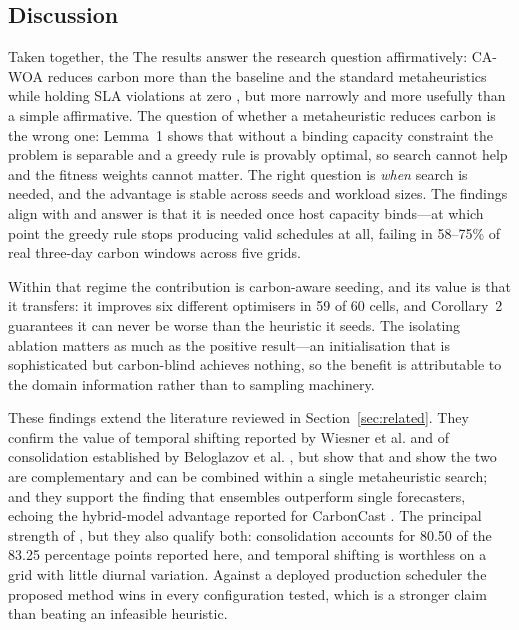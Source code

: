 \documentclass[12pt,a4paper]{article}
\providecommand{\DIFaddtex}[1]{{\protect\color{blue} \sf #1}} %
\providecommand{\DIFdeltex}[1]{{\protect\color{red} \scriptsize #1}} %
\providecommand{\DIFaddbegin}{} %
\providecommand{\DIFaddend}{} %
\providecommand{\DIFdelbegin}{} %
\providecommand{\DIFdelend}{} %
\providecommand{\DIFadd}[1]{\texorpdfstring{\DIFaddtex{#1}}{#1}} %
\providecommand{\DIFdel}[1]{\texorpdfstring{\DIFdeltex{#1}}{}} %
\providecommand{\DIFscaledelfig}{0.5}
\newlength{\DIFdelgraphicswidth} %
\newlength{\DIFdelgraphicsheight} %
\providecommand{\DIFaddincludegraphics}[2][]{{\color{blue}\fbox{\DIFOincludegraphics[#1]{#2}}}} %
\providecommand{\DIFdelincludegraphics}[2][]{%
\sbox{\DIFdelgraphicsbox}{\DIFOincludegraphics[#1]{#2}}%
\settoboxwidth{\DIFdelgraphicswidth}{\DIFdelgraphicsbox} %
\settoboxtotalheight{\DIFdelgraphicsheight}{\DIFdelgraphicsbox} %
\scalebox{\DIFscaledelfig}{%
\parbox[b]{\DIFdelgraphicswidth}{\usebox{\DIFdelgraphicsbox}\\[-\baselineskip] \rule{\DIFdelgraphicswidth}{0em}}\llap{\resizebox{\DIFdelgraphicswidth}{\DIFdelgraphicsheight}{%
\setlength{\unitlength}{\DIFdelgraphicswidth}%
\begin{picture}(1,1)%
\thicklines\linethickness{2pt} %
{\color[rgb]{1,0,0}\put(0,0){\framebox(1,1){}}}%
{\color[rgb]{1,0,0}\put(0,0){\line( 1,1){1}}}%
{\color[rgb]{1,0,0}\put(0,1){\line(1,-1){1}}}%
\end{picture}%
}\hspace*{3pt}}} %
} %
\DeclareRobustCommand{\DIFaddbegin}{\DIFOaddbegin \let\includegraphics\DIFaddincludegraphics} %
\DeclareRobustCommand{\DIFaddend}{\DIFOaddend \let\includegraphics\DIFOincludegraphics} %
\DeclareRobustCommand{\DIFdelbegin}{\DIFOdelbegin \let\includegraphics\DIFdelincludegraphics} %
\DeclareRobustCommand{\DIFdelend}{\DIFOaddend \let\includegraphics\DIFOincludegraphics} %
\begin{document}
\subsection{Discussion}
\DIFdelbegin \DIFdel{Taken together, the }\DIFdelend \DIFaddbegin \DIFadd{The }\DIFaddend results answer the research question\DIFdelbegin \DIFdel{affirmatively: CA-WOA reduces carbon more than the
baseline and the standard metaheuristics while holding SLA violations at zero}\DIFdelend \DIFaddbegin \DIFadd{, but more narrowly and more usefully than a simple affirmative. The
question of whether a metaheuristic reduces carbon is the wrong one: Lemma~1 shows that without a binding
capacity constraint the problem is separable and a greedy rule is provably optimal, so search cannot help and
the fitness weights cannot matter. The right question is \emph{when} search is needed}\DIFaddend , and the \DIFdelbegin \DIFdel{advantage is stable
across seeds and workload sizes. The findings align with and }\DIFdelend \DIFaddbegin \DIFadd{answer is that
it is needed once host capacity binds---at which point the greedy rule stops producing valid schedules at all,
failing in 58--75\% of real three-day carbon windows across five grids.
}

\DIFadd{Within that regime the contribution is carbon-aware seeding, and its value is that it transfers: it improves
six different optimisers in 59 of 60 cells, and Corollary~2 guarantees it can never be worse than the
heuristic it seeds. The isolating ablation matters as much as the positive result---an initialisation that is
sophisticated but carbon-blind achieves nothing, so the benefit is attributable to the domain information
rather than to sampling machinery.
}

\DIFadd{These findings }\DIFaddend extend the literature reviewed in Section~\ref{sec:related}. They confirm the value of temporal
shifting \DIFdelbegin \DIFdel{reported by Wiesner et al.
}\DIFdelend \cite{wiesner2021lets} and of consolidation \DIFdelbegin \DIFdel{established by Beloglazov et al. \cite{beloglazov2012energy} , but
show that }\DIFdelend \DIFaddbegin \DIFadd{\cite{beloglazov2012energy} and show }\DIFaddend the two are
complementary\DIFdelbegin \DIFdel{and can be combined within a single metaheuristic search; and they support
the finding that ensembles outperform single forecasters, echoing the hybrid-model advantage reported for
CarbonCast \cite{maji2022carboncast}.
The principal strength of }\DIFdelend \DIFaddbegin \DIFadd{, but they also qualify both: consolidation accounts for 80.50 of the 83.25 percentage points
reported here, and temporal shifting is worthless on a grid with little diurnal variation. Against a deployed
production scheduler \cite{radovanovic2023carbon} the proposed method wins in every configuration tested,
which is a stronger claim than beating an infeasible heuristic.
}
\end{document}
